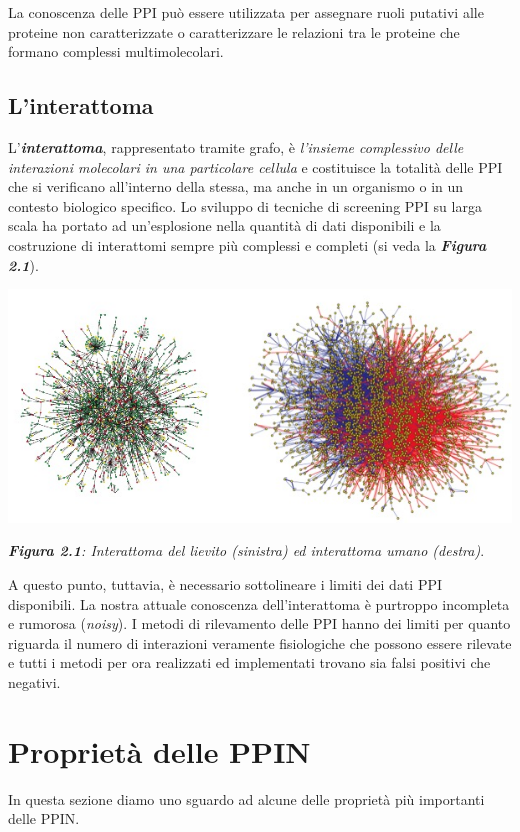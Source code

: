 \documentclass[11pt]{article}
\begin{document}
La conoscenza delle PPI può essere utilizzata per assegnare ruoli putativi alle proteine non caratterizzate o caratterizzare le relazioni tra le proteine che formano complessi multimolecolari.

\subsection{L'interattoma}
L'\textbf{\textit{interattoma}}, rappresentato tramite grafo, è \textit{l'insieme complessivo delle interazioni molecolari in una particolare cellula} e costituisce la totalità delle PPI che si verificano all'interno della stessa, ma anche in un organismo o in un contesto biologico specifico. Lo sviluppo di tecniche di screening PPI su larga scala ha portato ad un'esplosione nella quantità di dati disponibili e la costruzione di interattomi sempre più complessi e completi (si veda la \textit{\textbf{Figura 2.1}}).

\begin{center}
\includegraphics[scale=0.67]{interact}

\begin{small}\textit{\textbf{Figura 2.1}: Interattoma del lievito (sinistra) ed interattoma umano (destra)}.\end{small}
\end{center}

A questo punto, tuttavia, è necessario sottolineare i limiti dei dati PPI disponibili. La nostra attuale conoscenza dell'interattoma è purtroppo incompleta e rumorosa (\textit{noisy}). I metodi di rilevamento delle PPI hanno dei limiti per quanto riguarda il numero di interazioni veramente fisiologiche che possono essere rilevate e tutti i metodi per ora realizzati ed implementati trovano sia falsi positivi che negativi.

\section{Proprietà delle PPIN}
In questa sezione diamo uno sguardo ad alcune delle proprietà più importanti delle PPIN.
\end{document}
